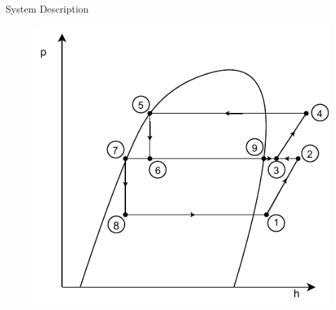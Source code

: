 \begin{frame}{System Description}{}
\begin{figure}[h]
\begin{minipage}{0.4\textwidth}
		\includegraphics[width=1.05\textwidth]{../Graphics/Flash_Tank_P-h_Diagram} %
	\end{minipage}
\end{figure}
\end{frame}

%
%

